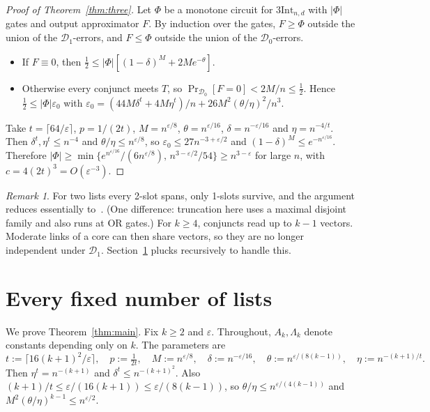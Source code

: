 \documentclass[11pt,a4paper]{article}
\theoremstyle{plain}
\theoremstyle{definition}
\theoremstyle{remark}
\newtheorem*{remark}{Remark}
\newcommand{\tInt}{3\mathrm{Int}}
\newcommand{\Dz}{\mathcal{D}_0}
\newcommand{\Do}{\mathcal{D}_1}
\begin{document}
\begin{proof}[Proof of Theorem~\ref{thm:three}]
Let $\Phi$ be a monotone circuit for $\tInt_{n,d}$ with $|\Phi|$ gates and output approximator $F$. By induction over
the gates, $F\ge\Phi$ outside the union of the $\Do$-errors, and $F\le\Phi$ outside the union of the $\Dz$-errors.
\begin{itemize}
  \item If $F\equiv0$, then $\frac12\le|\Phi|[(1-\delta)^M+2Me^{-\theta}]$.
  \item Otherwise every conjunct meets $T$, so $\Pr_{\Dz}[F=0]<2M/n\le\frac12$. Hence $\frac12\le|\Phi|\varepsilon_0$
    with $\varepsilon_0=(44M\delta^t+4M\eta^t)/n+26M^2(\theta/\eta)^2/n^3$.
\end{itemize}
Take $t=\lceil64/\varepsilon\rceil$, $p=1/(2t)$, $M=n^{\varepsilon/8}$, $\theta=n^{\varepsilon/16}$,
$\delta=n^{-\varepsilon/16}$ and $\eta=n^{-4/t}$. Then $\delta^t,\eta^t\le n^{-4}$ and $\theta/\eta\le n^{\varepsilon/8}$,
so $\varepsilon_0\le27n^{-3+\varepsilon/2}$ and $(1-\delta)^M\le e^{-n^{\varepsilon/16}}$. Therefore
$|\Phi|\ge\min\{e^{n^{\varepsilon/16}}/(6n^{\varepsilon/8}),\,n^{3-\varepsilon/2}/54\}\ge n^{3-\varepsilon}$ for large $n$,
with $c=4(2t)^3=O(\varepsilon^{-3})$.
\end{proof}

\begin{remark}
For two lists every 2-slot spans, only 1-slots survive, and the argument reduces essentially to~\cite{CLSS26}. (One
difference: truncation here uses a maximal disjoint family and also runs at OR gates.) For $k\ge4$, conjuncts read up
to $k-1$ vectors. Moderate links of a core can then share vectors, so they are no longer independent under $\Do$.
Section~\ref{sec:general} plucks recursively to handle this.
\end{remark}

\section{Every fixed number of lists}\label{sec:general}

We prove Theorem~\ref{thm:main}. Fix $k\ge2$ and $\varepsilon$. Throughout, $A_k,\Lambda_k$ denote constants depending only
on $k$. The parameters are
\[
t:=\lceil16(k+1)^2/\varepsilon\rceil,\quad p:=\tfrac1{2t},\quad M:=n^{\varepsilon/8},\quad
\delta:=n^{-\varepsilon/16},\quad \theta:=n^{\varepsilon/(8(k-1))},\quad \eta:=n^{-(k+1)/t}.
\]
Then $\eta^t=n^{-(k+1)}$ and $\delta^t\le n^{-(k+1)^2}$. Also $(k+1)/t\le\varepsilon/(16(k+1))\le\varepsilon/(8(k-1))$,
so $\theta/\eta\le n^{\varepsilon/(4(k-1))}$ and $M^2(\theta/\eta)^{k-1}\le n^{\varepsilon/2}$.
\end{document}
